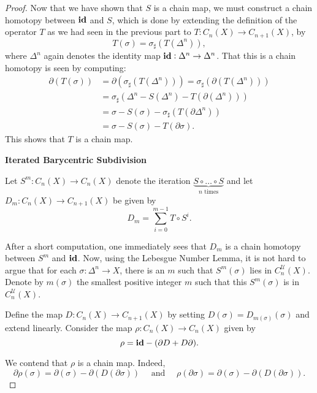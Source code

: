 \begin{proof}
Now that we have shown that $S$ is a chain map, we must construct a chain homotopy between $\mathbf{id}$ and $S$, which is done by extending the definition of the operator $T$ as we had seen in the previous part to $T: C_n(X)\to C_{n + 1}(X)$, by 
\begin{equation*}
    T(\sigma) = \sigma_\sharp(T(\Delta^n)),
\end{equation*}
where $\Delta^n$ again denotes the identity map $\mathbf{id}: \Delta^n\to\Delta^n$. That this is a chain homotopy is seen by computing: 
\begin{align*}
    \partial(T(\sigma)) &= \partial(\sigma_\sharp(T(\Delta^n))) = \sigma_\sharp(\partial(T(\Delta^n))) \\
    &= \sigma_\sharp(\Delta^n - S(\Delta^n) - T(\partial(\Delta^n)))\\
    &= \sigma - S(\sigma) - \sigma_\sharp(T(\partial\Delta^n))\\
    &= \sigma - S(\sigma) - T(\partial\sigma).
\end{align*}
This shows that $T$ is a chain map.

\noindent\textbf{Iterated Barycentric Subdivision}

Let $S^m: C_n(X)\to C_n(X)$ denote the iteration $\underbrace{S\circ\dots\circ S}_{n\text{ times}}$ and let $D_m: C_n(X)\to C_{n + 1}(X)$ be given by 
\begin{equation*}
    D_m = \sum_{i = 0}^{m - 1} T\circ S^i.
\end{equation*}

After a short computation, one immediately sees that $D_m$ is a chain homotopy between $S^m$ and $\mathbf{id}$. Now, using the Lebesgue Number Lemma, it is not hard to argue that for each $\sigma:\Delta^n\to X$, there is an $m$ such that $S^m(\sigma)$ lies in $C_n^{\mathscr U}(X)$. Denote by $m(\sigma)$ the smallest positive integer $m$ such that this $S^m(\sigma)$ is in $C_n^{\mathscr U}(X)$.

Define the map $D:C_n(X)\to C_{n + 1}(X)$ by setting $D(\sigma) = D_{m(\sigma)}(\sigma)$ and extend linearly. Consider the map $\rho: C_n(X)\to C_n(X)$ given by 
\begin{equation*}
    \rho = \mathbf{id} - (\partial D + D\partial).
\end{equation*}

We contend that $\rho$ is a chain map. Indeed, 
\begin{equation*}
    \partial\rho(\sigma) = \partial(\sigma) - \partial(D(\partial\sigma))\quad\text{ and }\quad\rho(\partial\sigma) = \partial(\sigma) - \partial(D(\partial\sigma)).
\end{equation*}


\end{proof}
